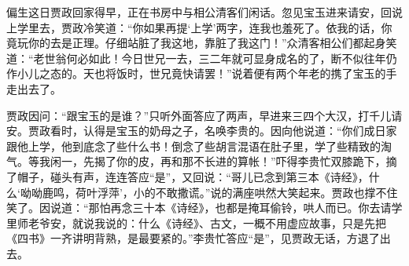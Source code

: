 \documentclass[12pt,oneside]{book}
\begin{document}
偏生这日贾政回家得早，正在书房中与相公清客们闲话。忽见宝玉进来请安，回说上学里去，贾政冷笑道：“你如果再提‘上学’两字，连我也羞死了。依我的话，你竟玩你的去是正理。仔细站脏了我这地，靠脏了我这门！”众清客相公们都起身笑道：“老世翁何必如此！今日世兄一去，三二年就可显身成名的了，断不似往年仍作小儿之态的。天也将饭时，世兄竟快请罢！”说着便有两个年老的携了宝玉的手走出去了。

贾政因问：“跟宝玉的是谁？”只听外面答应了两声，早进来三四个大汉，打千儿请安。贾政看时，认得是宝玉的奶母之子，名唤李贵的。因向他说道：“你们成日家跟他上学，他到底念了些什么书！倒念了些胡言混语在肚子里，学了些精致的淘气。等我闲一，先揭了你的皮，再和那不长进的算帐！”吓得李贵忙双膝跪下，摘了帽子，碰头有声，连连答应“是”，又回说：“哥儿已念到第三本《诗经》，什么‘呦呦鹿鸣，荷叶浮萍’，小的不敢撒谎。”说的满座哄然大笑起来。贾政也撑不住笑了。因说道：“那怕再念三十本《诗经》，也都是掩耳偷铃，哄人而已。你去请学里师老爷安，就说我说的：什么《诗经》、古文，一概不用虚应故事，只是先把《四书》一齐讲明背熟，是最要紧的。”李贵忙答应“是”，见贾政无话，方退了出去。
\end{document}
